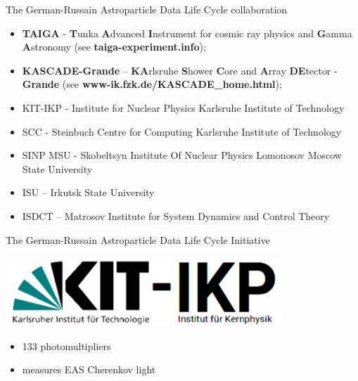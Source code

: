 \documentclass[18pt]{beamer}
\begin{document}


\appendix
\beginbackup

\begin{frame}
{The German-Russain Astroparticle Data Life Cycle collaboration}
    \begin{itemize}
	\item \textbf{\textcolor{kit-blue70}{TAIGA}} - \textbf{\textcolor{kit-blue70}{T}}unka \textbf{\textcolor{kit-blue70}{A}}dvanced
	\textbf{\textcolor{kit-blue70}{I}}nstrument for cosmic ray physics and \textbf{\textcolor{kit-blue70}{G}}amma
	\textbf{\textcolor{kit-blue70}{A}}stronomy (see \textbf{\textcolor{kit-blue70}{
	taiga-experiment.info}});
	\item \textbf{\textcolor{kit-orange70}{KASCADE-Grande}} -- \textbf{\textcolor{kit-orange70}{KA}}rlsruhe \textbf{\textcolor{kit-orange70}{S}}hower
	\textbf{\textcolor{kit-orange70}{C}}ore and \textbf{\textcolor{kit-orange70}{A}}rray \textbf{\textcolor{kit-orange70}{DE}}tector
	- \textbf{\textcolor{kit-orange70}{Grande}}
	(see \textbf{\textcolor{kit-blue70}{
	www-ik.fzk.de/KASCADE\_home.html}});
	\item KIT-IKP - Institute for Nuclear Physics Karlsruhe Institute of Technology
	\item SCC - Steinbuch Centre for Computing Karlsruhe Institute of Technology
	\item SINP MSU - Skobeltsyn Institute Of Nuclear Physics Lomonosov Moscow State University
	\item ISU -- Irkutsk State University
	\item ISDCT -- Matrosov Institute for System Dynamics and Control Theory
    \end{itemize}
\end{frame}

\begin{frame}{The German-Russain Astroparticle Data Life Cycle Initiative}
 \vspace{-2em}
\begin{minipage}[t]{0.41\textwidth}
    \parbox[c][0.20\textheight][t]{1\textwidth}{
      \centering
      \includegraphics[width=0.7742\textwidth]{pics/ikp-0.pdf}
    }
\vspace{-2em}
    \parbox[c][0.15\textheight][t]{1\textwidth}{
      \begin{itemize}
        \setlength{\itemsep}{0pt}
        \item 133 photomultipliers
        \item measures EAS Cherenkov light
      \end{itemize}
    }
\end{minipage}
\hfill
\end{frame}


\backupend
\end{document}
